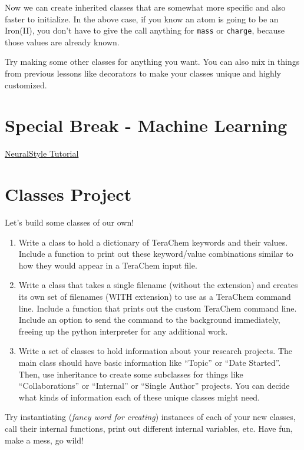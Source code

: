     Now we can create inherited classes that are somewhat more specific and
also faster to initialize. In the above case, if you know an atom is
going to be an Iron(II), you don't have to give the call anything for
\texttt{mass} or \texttt{charge}, because those values are already
known.

Try making some other classes for anything you want. You can also mix in
things from previous lessons like decorators to make your classes unique
and highly customized.
\section{Special Break - Machine Learning}

\href{https://github.com/anishathalye/neural-style}{NeuralStyle Tutorial}
\section{Classes Project}
Let's build some classes of our own!

\begin{enumerate}
\def\labelenumi{\arabic{enumi}.}
\tightlist
\item
  Write a class to hold a dictionary of TeraChem keywords and their
  values. Include a function to print out these keyword/value
  combinations similar to how they would appear in a TeraChem input
  file.
\item
  Write a class that takes a single filename (without the extension) and
  creates its own set of filenames (WITH extension) to use as a TeraChem
  command line. Include a function that prints out the custom TeraChem
  command line. Include an option to send the command to the background
  immediately, freeing up the python interpreter for any additional
  work.
\item
  Write a set of classes to hold information about your research
  projects. The main class should have basic information like ``Topic''
  or ``Date Started''. Then, use inheritance to create some subclasses
  for things like ``Collaborations'' or ``Internal'' or ``Single
  Author'' projects. You can decide what kinds of information each of
  these unique classes might need.
\end{enumerate}

Try instantiating (\emph{fancy word for creating}) instances of each of
your new classes, call their internal functions, print out different
internal variables, etc. Have fun, make a mess, go wild!
